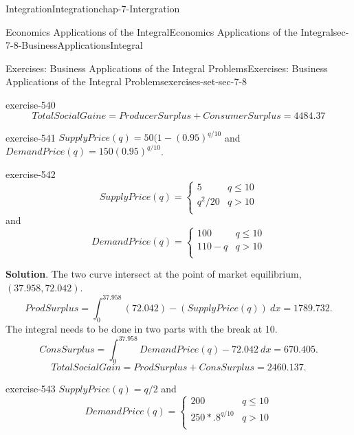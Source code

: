 \documentclass[oneside,10pt,]{book}
\numberwithin{equation}{section}
\begin{document}
\begin{chapterptx}{Integration}{}{Integration}{}{}{chap-7-Intergration}
\begin{sectionptx}{Economics Applications of the Integral}{}{Economics Applications of the Integral}{}{}{sec-7-8-BusinessApplicationsIntegral}
\begin{exercises-subsection-numberless}{Exercises: Business Applications of the Integral Problems}{}{Exercises: Business Applications of the Integral Problems}{}{}{exercises-set-sec-7-8}
\begin{divisionexercise}{3}{}{}{exercise-540}
%
\begin{equation*}
TotalSocialGaine=ProducerSurplus+ConsumerSurplus=4484.37
\end{equation*}
\end{divisionexercise}%
\begin{divisionexercise}{4}{}{}{exercise-541}%
\hypertarget{p-3131}{}%
\(SupplyPrice(q)= 50(1-(0.95)^{q/10}\) and \(DemandPrice(q)= 150(0.95)^{q/10}\).%
\end{divisionexercise}%
\begin{divisionexercise}{5}{}{}{exercise-542}%
%
\begin{equation*}
SupplyPrice(q)=\begin{cases}
5&q\le 10\\
q^2/20&q>10\\
\end{cases}
\end{equation*}
\hypertarget{p-3132}{}%
and%
%
\begin{equation*}
DemandPrice(q)=\begin{cases}
100&q\le 10\\
110-q&q>10\\
\end{cases}
\end{equation*}
\par\smallskip%
\noindent\textbf{Solution}.\hypertarget{solution-274}{}\quad%
\hypertarget{p-3133}{}%
The two curve intersect at the point of market equilibrium, \((37.958, 72.042)\).%
%
\begin{equation*}
ProdSurplus=
\int_0^{37.958}
(72.042)-
(SupplyPrice(q))\ dx=1789.732.
\end{equation*}
\hypertarget{p-3134}{}%
The integral needs to be done in two parts with the break at 10.%
%
\begin{equation*}
ConsSurplus=
\int_0^{37.958}
DemandPrice(q)-72.042\ dx=670.405.
\end{equation*}
%
\begin{equation*}
TotalSocialGain=ProdSurplus+ConsSurplus=2460.137.
\end{equation*}
\end{divisionexercise}%
\begin{divisionexercise}{6}{}{}{exercise-543}%
\hypertarget{p-3135}{}%
\(SupplyPrice(q)= q/2\) and%
%
\begin{equation*}
DemandPrice(q)=\begin{cases}
200&q\le 10\\
250*.8^{q/10}&q>10\\
\end{cases}

\end{equation*}
\end{divisionexercise}
\end{exercises-subsection-numberless}
\end{sectionptx}
\end{chapterptx}
\end{document}

